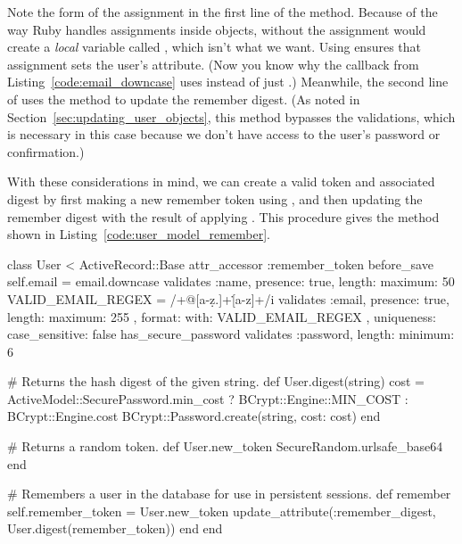 \noindent Note the form of the assignment in the first line of the  method. Because of the way Ruby handles assignments inside objects, without  the assignment would create a \emph{local} variable called , which isn't what we want. Using  ensures that assignment sets the user's  attribute. (Now you know why the  callback from Listing~\ref{code:email_downcase} uses  instead of just .) Meanwhile, the second line of  uses the  method to update the remember digest. (As noted in Section~\ref{sec:updating_user_objects}, this method bypasses the validations, which is necessary in this case because we don't have access to the user's password or confirmation.)

With these considerations in mind, we can create a valid token and associated digest by first making a new remember token using , and then updating the remember digest with the result of applying . This procedure gives the  method shown in Listing~\ref{code:user_model_remember}.

\begin{codelisting}
\label{code:user_model_remember}
\begin{code}
class User < ActiveRecord::Base
  attr_accessor :remember_token
  before_save { self.email = email.downcase }
  validates :name,  presence: true, length: { maximum: 50 }
  VALID_EMAIL_REGEX = /\A[\w+\-.]+@[a-z\d\-.]+\.[a-z]+\z/i
  validates :email, presence: true, length: { maximum: 255 },
                    format: { with: VALID_EMAIL_REGEX },
                    uniqueness: { case_sensitive: false }
  has_secure_password
  validates :password, length: { minimum: 6 }

  # Returns the hash digest of the given string.
  def User.digest(string)
    cost = ActiveModel::SecurePassword.min_cost ? BCrypt::Engine::MIN_COST :
                                                  BCrypt::Engine.cost
    BCrypt::Password.create(string, cost: cost)
  end

  # Returns a random token.
  def User.new_token
    SecureRandom.urlsafe_base64
  end

  # Remembers a user in the database for use in persistent sessions.
  def remember
    self.remember_token = User.new_token
    update_attribute(:remember_digest, User.digest(remember_token))
  end
end
\end{code}
\end{codelisting}

